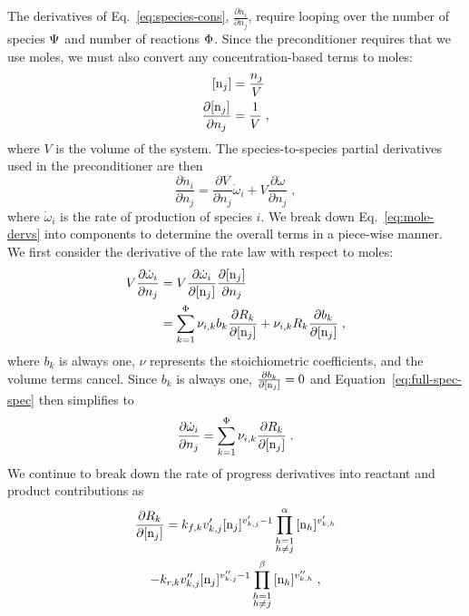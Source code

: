 \documentclass[twocolumn,10pt]{article}
\begin{document}
%
%
The derivatives of Eq.~\eqref{eq:species-cons}, $\frac{\partial \dot{n}_i}{\partial n_j}$, require looping over the number of species $\Psi$ and number of reactions $\Phi$.
Since the preconditioner requires that we use moles, we must also convert any concentration-based terms to moles:
\begin{align}
    \conc{n_j} &= \frac{n_j}{V}\\
    \frac{\partial \conc{n_j}}{\partial n_j} &= \frac{1}{V} \;,
\end{align}
where $V$ is the volume of the system.
The species-to-species partial derivatives used in the preconditioner are then
\begin{equation}
    \label{eq:mole-dervs}
    \frac{\partial \dot{n}_i}{\partial n_j} = \frac{\partial V}{\partial n_j} \dot{\omega}_i + V\frac{\partial \dot{\omega}}{\partial n_j} \;,
\end{equation}
where $\dot{\omega}_i$ is the rate of production of species $i$.
We break down Eq.~\ref{eq:mole-dervs} into components to determine the overall terms in a piece-wise manner.
We first consider the derivative of the rate law with respect to moles:
\begin{align}
    \label{eq:full-spec-spec}
    V \frac{\partial \dot{\omega}_i}{\partial n_j} &= V \frac{\partial \dot{\omega}_i}{\partial \conc{n_j}} \frac{\partial \conc{n_j}}{\partial n_j} \nonumber \\
    &= \ReacSum{\nu_{i,k}b_k\frac{\partial R_k}{\partial \conc{n_j}} + \nu_{i,k}R_k\frac{\partial b_k}{\partial\conc{n_j}}} \;,
\end{align}
where $b_k$ is always one, $\nu$ represents the stoichiometric coefficients, and the volume terms cancel.
Since $b_k$ is always one, $\frac{\partial b_k}{\partial\conc{n_j}}=0$ and Equation~\eqref{eq:full-spec-spec} then simplifies to
\begin{equation}
    \label{eq:spec-spec-derv}
    \frac{\partial \dot{\omega}_i}{\partial n_j} = \ReacSum{\nu_{i,k}\frac{\partial R_k}{\partial \conc{n_j}}} \;.
\end{equation}
We continue to break down the rate of progress derivatives into reactant and product contributions as
\begin{multline}
    \frac{\partial R_k}{\partial\conc{n_j}} = k_{f,k}{v_{k,j}^\prime} \conc{n_j}^{v_{k,j}^\prime-1}\ReactSpecProd{\conc{n_h}^{v_{k,h}^\prime}}\\
    -k_{r,k}v_{k,j}^{\prime\prime}\conc{n_j}^{v_{k,j}^{\prime\prime}-1}\ProdSpecProd{\conc{n_h}^{v_{k,h}^{\prime\prime}}} \;,
\end{multline}
\end{document}
